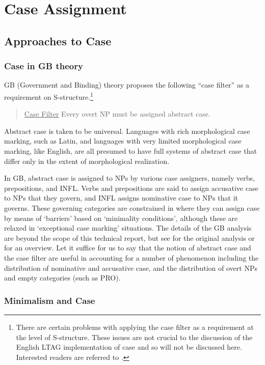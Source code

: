 \section{Case Assignment}
\subsection{Approaches to Case}
\subsubsection{Case in GB theory}

GB (Government and Binding) theory proposes the following ``case filter'' as a
requirement on S-structure.\footnote{There are certain problems with applying
the case filter as a requirement at the level of S-structure.  These issues are
not crucial to the discussion of the English LTAG implementation of case and so
will not be discussed here.  Interested readers are referred to
\cite{lasnik-uriagereka88}.}

\begin{verse}
\underline{Case Filter}
Every overt NP must be assigned abstract case.
\end{verse}

Abstract case is taken to be universal.  Languages with rich morphological case
marking, such as Latin, and languages with very limited morphological case
marking, like English, are all presumed to have full systems of abstract case
that differ only in the extent of morphological realization.

In GB, abstract case is assigned to NPs by various case assigners, namely
verbs, prepositions, and INFL.  Verbs and prepositions are said to assign
accusative case to NPs that they govern, and INFL assigns nominative case to
NPs that it governs.  These governing categories are constrained in where they
can assign case by means of `barriers' based on `minimality conditions',
although these are relaxed in `exceptional case marking' situations.  The
details of the GB analysis are beyond the scope of this technical report, but
see \cite{chomsky86} for the original analysis or \cite{haegeman91} for an
overview.  Let it suffice for us to say that the notion of abstract case and
the case filter are useful in accounting for a number of phenomenon including
the distribution of nominative and accusative case, and the distribution of
overt NPs and empty categories (such as PRO).

\subsubsection{Minimalism and Case} 

